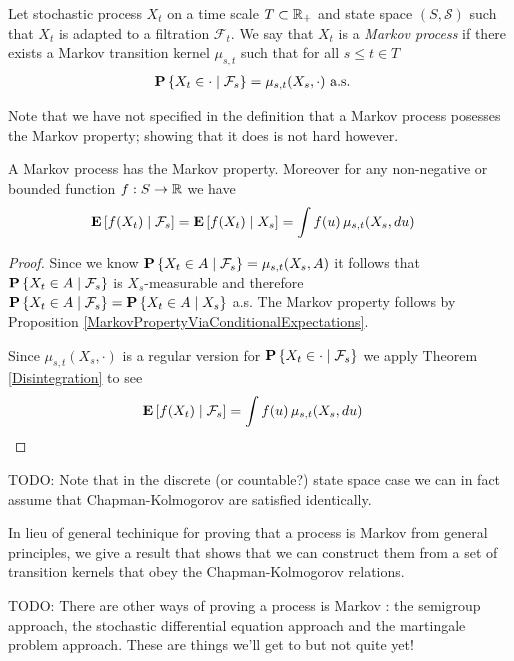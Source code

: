 \begin{defn}
Let stochastic process $X_t$ on a time scale $T
\subset \reals_+$ and  state space $(S, \mathcal{S})$ such that $X_t$ is adapted to a filtration $\mathcal{F}_t$.  We say that
$X_t$ is a \emph{Markov process} if there exists a
Markov transition kernel $\mu_{s,t}$ such that for all $s \leq t \in T$
\begin{align*}
\cprobability{\mathcal{F}_s}{X_t \in \cdot} &= \mu_{s,t}(X_s, \cdot) \text{ a.s.}
\end{align*}
\end{defn}

Note that we have not specified in the definition that a Markov process posesses the Markov property; showing that
it does is not hard however.
\begin{prop}A Markov process has the Markov property.  Moreover for any non-negative or bounded function $f : S \to \reals$ we have
\begin{align*}
\cexpectationlong{\mathcal{F}_s}{f(X_t)} &= \cexpectationlong{X_s}{f(X_t)} = \int f(u) \, \mu_{s,t}(X_s, du)
\end{align*}
\end{prop}
\begin{proof}
Since we know $\cprobability{\mathcal{F}_s}{X_t \in A} = \mu_{s,t}(X_s, A)$ it follows that $\cprobability{\mathcal{F}_s}{X_t \in A}$ is $X_s$-measurable and therefore 
$\cprobability{\mathcal{F}_s}{X_t \in A} = \cprobability{X_s}{X_t \in A}$ a.s.  The Markov property follows by Proposition \ref{MarkovPropertyViaConditionalExpectations}.

Since $\mu_{s,t}(X_s, \cdot)$ is a regular version for $\cprobability{\mathcal{F}_s}{X_t \in \cdot}$ we apply Theorem \ref{Disintegration} to see
\begin{align*}
\cexpectationlong{\mathcal{F}_s}{f(X_t)} &= \int f(u) \, \mu_{s,t}(X_s, du)
\end{align*}
\end{proof}


TODO: Note that in the discrete (or countable?) state space case we
can in fact assume that Chapman-Kolmogorov are satisfied identically.

In lieu of general techinique for proving that a process is Markov
from general principles, we give a result that shows that we can
construct them from a set of transition kernels that obey the
Chapman-Kolmogorov relations.

TODO: There are other ways of proving a process is Markov : the
semigroup approach, the stochastic differential equation approach and
the martingale problem approach.  These are things we'll get to but
not quite yet!

